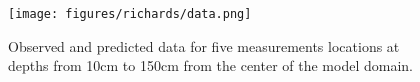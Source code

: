 \begin{figure}[!htbp]
\begin{center}
\texttt{[image: figures/richards/data.png]}
\end{center}
\caption{Observed and predicted data for five measurements locations at depths from 10cm to 150cm from the center of the model domain.}
\label{fig:richards-data}
\end{figure}

